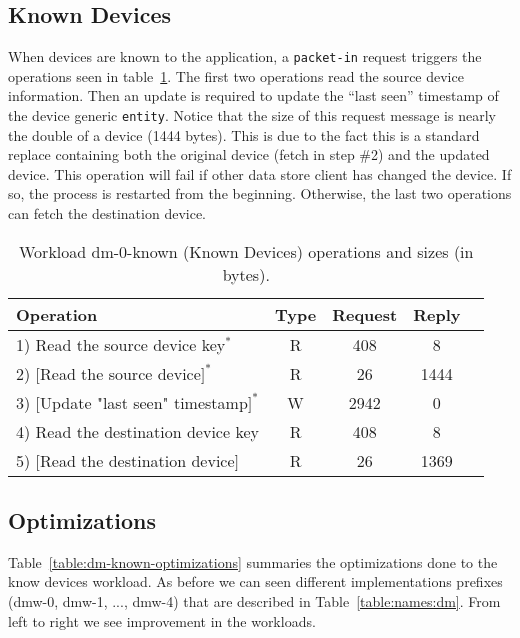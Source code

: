 \subsection{Known Devices}

When devices are known to the application, a \texttt{packet-in} request
triggers the operations seen in table~\ref{table:ops:dm-0-known}. The
first two operations read the source device information. 
Then an update is required to update the ``last seen'' timestamp of the device generic \texttt{entity}. 
Notice that the size of this request message is nearly the double of a device (1444 bytes). 
This is due to the fact this is a standard replace  containing both the original device (fetch in step \#2) and the updated device. 
This operation will fail if other data store client  has changed the device. If so, the process is restarted from the beginning. 
Otherwise, the last two operations can fetch the  destination device. 

\begin{table}[H]
\small
\centering 
\begin{tabular}{l c c c c}
Operation & Type & Request & Reply \\ \toprule 
1) Read the source device key$^*$ & R & 408 & 8\\
2) $[$Read the source device$]^*$ & R & 26 & 1444\\
3) $[$Update "last seen" timestamp$]^*$ & W & 2942 & 0\\
4) Read the destination device key & R & 408 & 8\\
5) $[$Read the destination device$]$ & R & 26 & 1369 \\ \bottomrule 
\end{tabular}
\caption[Workload dm-0-known (Known Devices) operations]{Workload
  dm-0-known (Known Devices) operations and sizes (in bytes).}
\label{table:ops:dm-0-known}
\end{table}


\subsection{Optimizations}
Table~\ref{table:dm-known-optimizations} summaries the optimizations done to the know  devices workload. 
As before we can seen different implementations prefixes (dmw-0, dmw-1, ..., dmw-4) that are described in Table~\ref{table:names:dm}. 
From left to right we see improvement in the workloads. 

